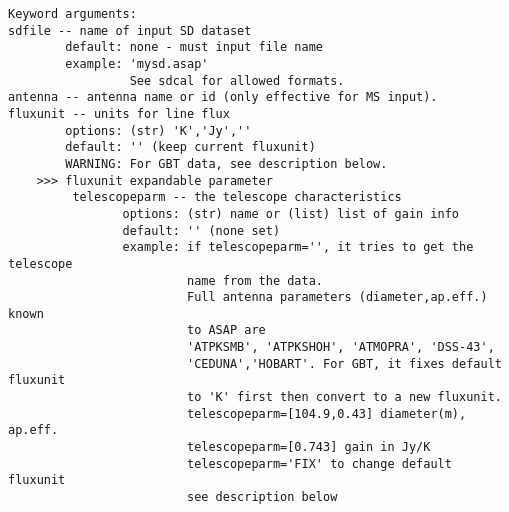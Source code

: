 \begin{verbatim}
Keyword arguments:
sdfile -- name of input SD dataset
        default: none - must input file name
        example: 'mysd.asap'
                 See sdcal for allowed formats.
antenna -- antenna name or id (only effective for MS input).
fluxunit -- units for line flux
        options: (str) 'K','Jy',''
        default: '' (keep current fluxunit)
        WARNING: For GBT data, see description below.
    >>> fluxunit expandable parameter
         telescopeparm -- the telescope characteristics
                options: (str) name or (list) list of gain info
                default: '' (none set)
                example: if telescopeparm='', it tries to get the telescope
                         name from the data.
                         Full antenna parameters (diameter,ap.eff.) known
                         to ASAP are
                         'ATPKSMB', 'ATPKSHOH', 'ATMOPRA', 'DSS-43',
                         'CEDUNA','HOBART'. For GBT, it fixes default fluxunit
                         to 'K' first then convert to a new fluxunit.
                         telescopeparm=[104.9,0.43] diameter(m), ap.eff.
                         telescopeparm=[0.743] gain in Jy/K
                         telescopeparm='FIX' to change default fluxunit
                         see description below


\end{verbatim}
